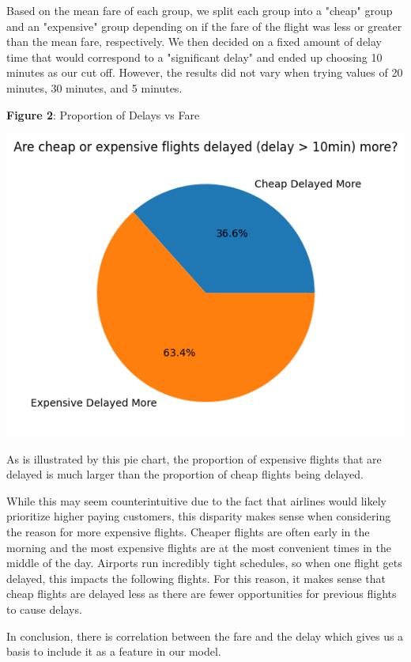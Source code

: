 \documentclass{article}
\begin{document}
Based on the mean fare of each group, we split each group into a "cheap" group and an "expensive" group depending on if the fare of the flight was less or greater than the mean fare, respectively. We then decided on a fixed amount of delay time that would correspond to a "significant delay" and ended up choosing 10 minutes as our cut off. However, the results did not vary when trying values of 20 minutes, 30 minutes, and 5 minutes. 

\begin{center}
    \textbf{Figure 2}: Proportion of Delays vs Fare
\end{center}
\includegraphics[scale=0.75]{images/DelayVsFare.png}

As is illustrated by this pie chart, the proportion of expensive flights that are delayed is much larger than the proportion of cheap flights being delayed. 

While this may seem counterintuitive due to the fact that airlines would likely prioritize higher paying customers, this disparity makes sense when considering the reason for more expensive flights. Cheaper flights are often early in the morning and the most expensive flights are at the most convenient times in the middle of the day. Airports run incredibly tight schedules, so when one flight gets delayed, this impacts the following flights. For this reason, it makes sense that cheap flights are delayed less as there are fewer opportunities for previous flights to cause delays.

In conclusion, there is correlation between the fare and the delay which gives us a basis to include it as a feature in our model. 
\end{document}
